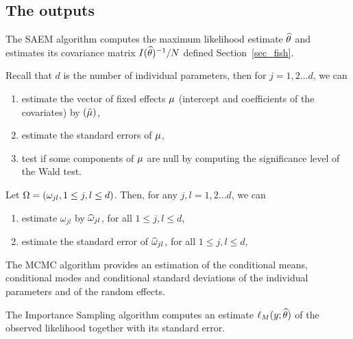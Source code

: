 \subsection{The outputs}


The SAEM algorithm computes the maximum likelihood estimate ${\widehat{\theta}}$ and estimates its covariance
matrix $I({{\widehat{\theta}}})^{-1}/N$ defined Section~\ref{sec_fish}.

Recall that $d$ is the number of individual parameters, then for $j=1,2\ldots d$, we can
\begin{enumerate}
\item estimate the vector of fixed effects $\fixed_effect$ (intercept and coefficients of the covariates) by $(\hat{\fixed_effect})$,
\item estimate the standard errors of $\fixed_effect$,
\item test if some components of $\fixed_effect$ are null by computing the significance level of the Wald test.
\end{enumerate}


Let ${\Omega}=(\omega_{jl}, 1\leq j,l \leq d)$. Then, for any $j,l=1,2\ldots d$, we can
\begin{enumerate}
\item estimate $\omega_{jl}$ by ${\widehat{\omega}}_{jl}$, for all $1\leq j,l \leq d$,
\item estimate the standard error of ${\widehat{\omega}}_{jl}$, for all $1\leq j,l \leq d$,
\end{enumerate}


The MCMC algorithm provides an estimation of the conditional means, conditional modes and conditional standard deviations of the individual
parameters and of the random effects.


The Importance Sampling algorithm computes an estimate $ \ell_M(y;{\widehat{\theta}})$ of the observed likelihood together with its standard error.


